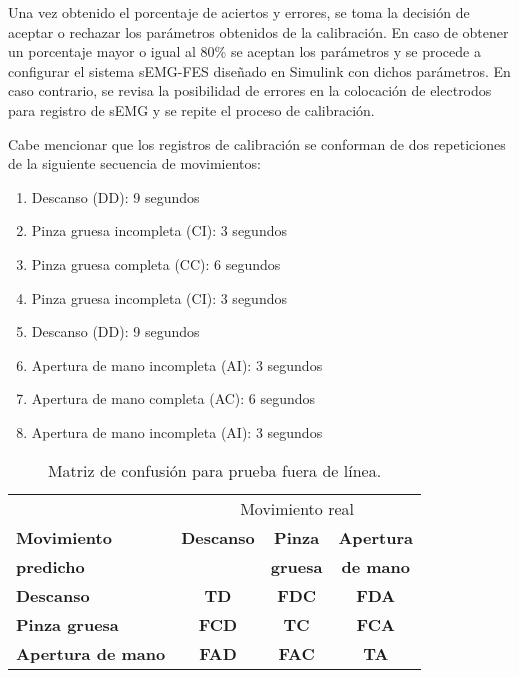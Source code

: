 Una vez obtenido el porcentaje de aciertos y errores, se toma la decisión de aceptar o rechazar los parámetros obtenidos de la calibración. En caso de obtener un porcentaje mayor o igual al 80\% se aceptan los parámetros y se procede a configurar el sistema sEMG-FES diseñado en Simulink \textregistered \; con dichos parámetros. En caso contrario, se revisa la posibilidad de errores en la colocación de electrodos para registro de sEMG y se repite el proceso de calibración.

Cabe mencionar que los registros de calibración se conforman de dos repeticiones de la siguiente secuencia de movimientos:

\begin{enumerate}
	\item Descanso (DD): 9 segundos
	\item Pinza gruesa incompleta (CI): 3 segundos
	\item Pinza gruesa completa (CC): 6 segundos
	\item Pinza gruesa incompleta (CI): 3 segundos
	\item Descanso (DD): 9 segundos
	\item Apertura de mano incompleta (AI): 3 segundos
	\item Apertura de mano completa (AC): 6 segundos
	\item Apertura de mano incompleta (AI): 3 segundos
\end{enumerate}

\begin{table}[htbp]
	\centering
	\begin{tabular}{|l|c|c|c|}
	\hline
	\textbf{} & \multicolumn{3}{|c|}{Movimiento real}\\
	\textbf{Movimiento} & \textbf{Descanso} & \textbf{Pinza} & \textbf{Apertura}\\
	\textbf{predicho} & \textbf{} & \textbf{gruesa} & \textbf{de mano}\\ \hline \hline
	\textbf{Descanso} & \textbf{TD} & \textbf{FDC} & \textbf{FDA}\\ \hline
	\textbf{Pinza gruesa} & \textbf{FCD} & \textbf{TC} & \textbf{FCA}\\ \hline
	\textbf{Apertura de mano} & \textbf{FAD} & \textbf{FAC} & \textbf{TA}\\ \hline
	\end{tabular}
	\caption{Matriz de confusión para prueba fuera de línea.}
	\label{Cuadro:PorcentajesObtencion}
\end{table}


